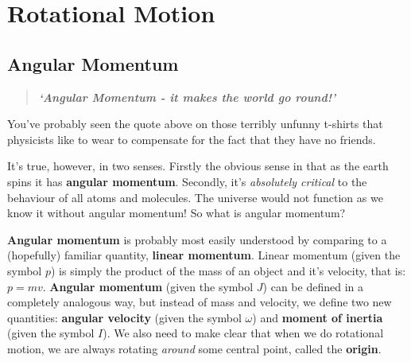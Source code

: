\documentclass{memoir}[11pt,oneside,a4paper,openany]
\begin{document}
\chapter{Rotational Motion}

\section{Angular Momentum}
\begin{center}
\begin{quote}
	\textit{\textbf{`Angular Momentum - it makes the world go round!'}} 
\end{quote}
\end{center}
You've probably seen the quote above on those terribly unfunny t-shirts that physicists like to wear to compensate for the fact that they have no friends.

It's true, however, in two senses. Firstly the obvious sense in that as the earth spins it has \textbf{angular momentum}. Secondly, it's \emph{absolutely critical} to the behaviour of all atoms and molecules. The universe would not function as we know it without angular momentum! So what is angular momentum?

\textbf{Angular momentum} is probably most easily understood by comparing to a (hopefully) familiar quantity, \textbf{linear momentum}. Linear momentum (given the symbol $p$) is simply the product of the mass of an object and it's velocity, that is: $p = mv$. \textbf{Angular momentum} (given the symbol $J$) can be defined in a completely analogous way, but instead of mass and velocity, we define two new quantities: \textbf{angular velocity} (given the symbol $\omega$) and \textbf{moment of inertia} (given the symbol $I$). We also need to make clear that when we do rotational motion, we are always rotating \emph{around} some central point, called the \textbf{origin}. 
\end{document}
